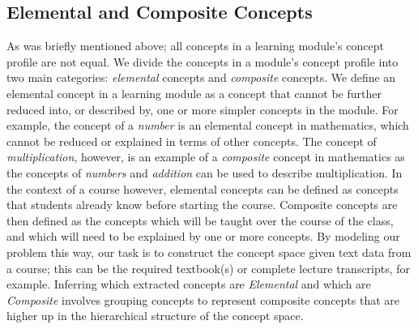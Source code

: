 \subsection{Elemental and Composite Concepts}
As was briefly mentioned above; all concepts in a learning module's concept profile are not equal.
We divide the concepts in a module's concept profile into two main categories: \textit{elemental} concepts and \textit{composite} concepts. 
We define an elemental concept in a learning module as a concept that cannot be further reduced into, or described by, one or more simpler concepts in the module. For example, the concept of a \textit{number} is an elemental concept in mathematics, which cannot be reduced or explained in terms of other concepts. The concept of \textit{multiplication}, however, is an example of a \textit{composite} concept in mathematics as the concepts of \textit{numbers} and \textit{addition} can be used to describe multiplication. In the context of a course however, elemental concepts can be defined as concepts that students already know before starting the course. Composite concepts are then defined as the concepts which will be taught over the course of the class, and which will need to be explained by one or more concepts.
By modeling our problem this way, our task is to construct the concept space given text data from a course; this can be the required textbook(s) or complete lecture transcripts, for example. Inferring which extracted concepts are \textit{Elemental} and which are \textit{Composite} involves grouping concepts to represent composite concepts that are higher up in the hierarchical structure of the concept space.
